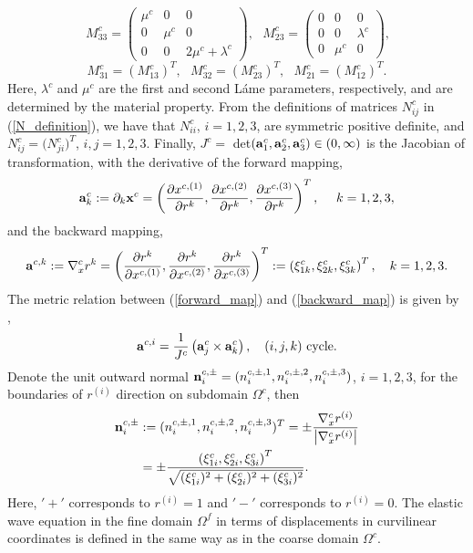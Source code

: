 \[\ M_{33}^c = \left(\begin{array}{ccc}
\mu^c & 0 & 0\\
0 & \mu^c & 0\\
0 & 0 & 2\mu^c+\lambda^c\end{array}\right),\ \ \ M_{23}^c = \left(\begin{array}{ccc}
0 & 0 & 0\\
0 & 0 & \lambda^c\\
0 & \mu^c & 0\end{array}\right),\]
\[ M_{31}^c = (M_{13}^c)^T, \ \ \  M_{32}^c =(M_{23}^c)^T, \ \ \ M_{21}^c =(M_{12}^c)^T.\]
Here, $\lambda^c$ and $\mu^c$ are the first and second L{\' {a}}me parameters, respectively, and are determined by the material property. From the definitions of matrices $N_{ij}^c$ in (\ref{N_definition}), we have that $N_{ii}^c$, $i = 1,2,3$, are symmetric positive definite, and $N_{ij}^c=\big(N_{ji}^c\big)^T$, $i,j=1,2,3$. Finally, $J^c =$ det$\left({\bf a}^c_1,{\bf a}^c_2,{\bf a}^c_3\right)\in (0,\infty)$ is the Jacobian of transformation, with the derivative of the forward mapping, 
\begin{equation}\label{forward_map}
{\bf a}_k^c := \partial_k{\bf x}^c  = \left(\frac{\partial x^{c,(1)}}{\partial r^{k}},\frac{\partial x^{c,(2)}}{\partial r^{k}},\frac{\partial x^{c,(3)}}{\partial r^{k}}\right)^T,\ \ \ \ k = 1,2,3,
\end{equation}
and the backward mapping,
\begin{equation}\label{backward_map}
{\bf a}^{c,k} := \nabla_x^c r^{k} = \left(\frac{\partial r^{k}}{\partial x^{c,(1)}},\frac{\partial r^{k}}{\partial x^{c,(2)}},\frac{\partial r^{k}}{\partial x^{c,(3)}}\right)^T := \left(\xi_{1k}^c,\xi_{2k}^c,\xi_{3k}^c\right)^T,\ \ \ k = 1,2,3.
\end{equation}
 The metric relation between (\ref{forward_map}) and (\ref{backward_map}) is given by \cite{thompson1985numerical},
\begin{equation*}
{\bf a}^{c,i} = \frac{1}{J^c}\left({\bf a}_j^c\times{\bf a}_k^c\right), \ \ \ (i,j,k) \ \mbox{cycle}.
\end{equation*}
Denote the unit outward normal ${\bf n}_i^{c,\pm} = (n_i^{c,\pm,1},n_i^{c,\pm,2},n_i^{c,\pm,3})$, $i = 1,2,3$, for the boundaries of $r^{(i)}$ direction on subdomain $\Omega^c$, then
\begin{align}\label{outward_normal}
{\bf n}_i^{c,\pm} &:= (n^{c,\pm,1}_i,n^{c,\pm,2}_i,n^{c,\pm,3}_i)^T = \pm \frac{\nabla_x^c r^{(i)}}{\left|\nabla_x^c r^{(i)}\right|} \nonumber\\
&= \pm\frac{ \left(\xi_{1i}^c,\xi_{2i}^c,\xi_{3i}^c\right)^T}{\sqrt{(\xi_{1i}^c)^2+(\xi_{2i}^c)^2+(\xi_{3i}^c)^2}}.
\end{align}
Here, $'+'$ corresponds to $r^{(i)} = 1$ and $'-'$ corresponds to $r^{(i)} = 0$. The elastic wave equation in the fine domain $\Omega^f$ in terms of displacements in curvilinear coordinates is defined in the same way as in the  coarse domain $\Omega^c$.

